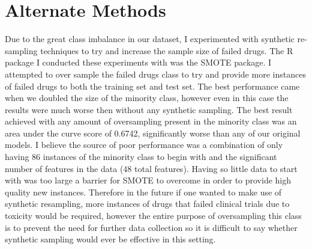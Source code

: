 \documentclass[12pt]{article}
\begin{document}
\section{Alternate Methods}
Due to the great class imbalance in our dataset, I experimented with synthetic re-sampling techniques to try and increase the sample size of failed drugs. The R package I conducted these experiments with was the SMOTE package. I attempted to over sample the failed drugs class to try and provide more instances of failed drugs to both the training set and test set. The best performance came when we doubled the size of the minority class, however even in this case the results were much worse then without any synthetic sampling. The best result achieved with any amount of oversampling present in the minority class was an area under the curve score of 0.6742, significantly worse than any of our original models. I believe the source of poor performance was a combination of only having 86 instances of the minority class to begin with and the significant number of features in the data (48 total features). Having so little data to start with was too large a barrier for SMOTE to overcome in order to provide high quality new instances. Therefore in the future if one wanted to make use of synthetic resampling, more instances of drugs that failed clinical trials due to toxicity would be required, however the entire purpose of oversampling this class is to prevent the need for further data collection so it is difficult to say whether synthetic sampling would ever be effective in this setting.  
\end{document}
